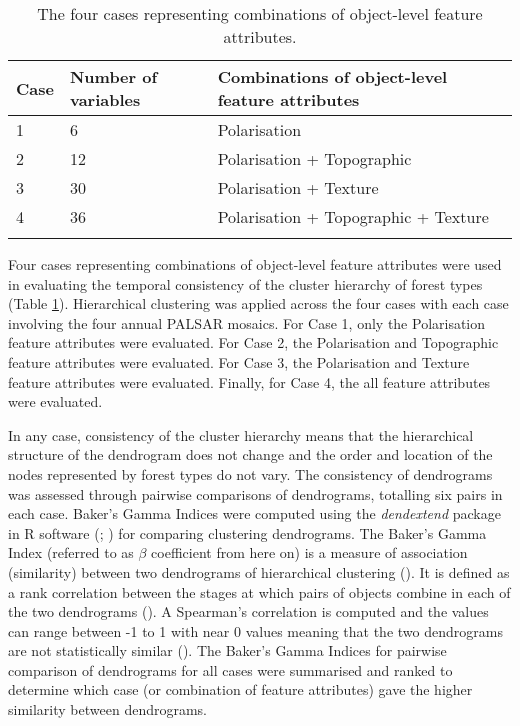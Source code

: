\begin{spacing}{1.0}
\begin{longtable}[h!]{ p{2cm} p{2cm} p{9cm} }

    \caption[Four cases representing combinations of object-level feature attributes.]{The four cases representing combinations of object-level feature attributes.}
    \label{tab: method-table3.3}\\
    
    	\toprule
    	Case & Number of variables & Combinations of object-level feature attributes\\
       	\midrule
    	\endhead
    	
		1 & 6 & Polarisation\\
		2 & 12 & Polarisation + Topographic\\
		3 & 30 & Polarisation + Texture\\
		4 & 36 & Polarisation + Topographic + Texture\\
		
		\bottomrule \\
    
\end{longtable}
\end{spacing}

Four cases representing combinations of object-level feature attributes were used in evaluating the temporal consistency of the cluster hierarchy of forest types (Table \ref{tab: method-table3.3}). Hierarchical clustering was applied across the four cases with each case involving the four annual PALSAR mosaics. For Case 1, only the Polarisation feature attributes were evaluated. For Case 2, the Polarisation and Topographic feature attributes were evaluated. For Case 3, the Polarisation and Texture feature attributes were evaluated. Finally, for Case 4, the all feature attributes were evaluated.

In any case, consistency of the cluster hierarchy means that the hierarchical structure of the dendrogram does not change and the order and location of the nodes represented by forest types do not vary. The consistency of dendrograms was assessed through pairwise comparisons of dendrograms, totalling six pairs in each case. Baker's Gamma Indices were computed using the \textit{dendextend} package in R software (\cite{galili_dendextend:_2015}; \cite{galili_dendextend:_2015-1}) for comparing clustering dendrograms. The Baker’s Gamma Index (referred to as $\beta$ coefficient from here on) is a measure of association (similarity) between two dendrograms of hierarchical clustering (\cite{baker_stability_1974}). It is defined as a rank correlation between the stages at which pairs of objects combine in each of the two dendrograms (\cite{fowlkes_method_1983}). A Spearman's correlation is computed and the values can range between -1 to 1 with near 0 values meaning that the two dendrograms are not statistically similar (\cite{galili_dendextend:_2015}). The Baker's Gamma Indices for pairwise comparison of dendrograms for all cases were summarised and ranked to determine which case (or combination of feature attributes) gave the higher similarity between dendrograms.

